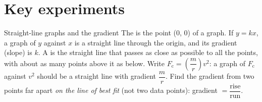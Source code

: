 \section{Key experiments}\label{ch2:sec:exp}

\begin{toolkit}{Straight-line graphs and the gradient}
The  is the point (0, 0) of a graph. If $y = kx$, a graph of $y$ against $x$ is a
straight line through the origin, and its gradient (slope) is $k$. A 
is the straight line that passes as close as possible to all the points, with about as many
points above it as below. Write $F_\mathrm{c} = \left(\dfrac{m}{r}\right) v^2$: a graph of
$F_\mathrm{c}$ against $v^2$ should be a straight line with gradient $\dfrac{m}{r}$. Find the
gradient from two points far apart \emph{on the line of best fit} (not two data points):
gradient $= \dfrac{\text{rise}}{\text{run}}$.
\end{toolkit}

